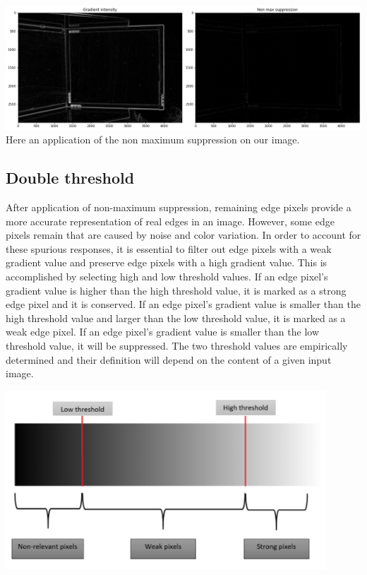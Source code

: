 \documentclass{article}
\begin{document}
\includegraphics[width=14cm]{images/img8.png}
Here an application of the non maximum suppression on our image.

\subsection{Double threshold}

After application of non-maximum suppression, remaining edge pixels provide a more accurate representation of real edges in an image. However, some edge pixels remain that are caused by noise and color variation. In order to account for these spurious responses, it is essential to filter out edge pixels with a weak gradient value and preserve edge pixels with a high gradient value. This is accomplished by selecting high and low threshold values. If an edge pixel's gradient value is higher than the high threshold value, it is marked as a strong edge pixel and it is conserved. If an edge pixel's gradient value is smaller than the high threshold value and larger than the low threshold value, it is marked as a weak edge pixel. If an edge pixel's gradient value is smaller than the low threshold value, it will be suppressed. The two threshold values are empirically determined and their definition will depend on the content of a given input image.
\vspace{1 cm}

\includegraphics[width=12cm]{images/img9.png}
\end{document}
